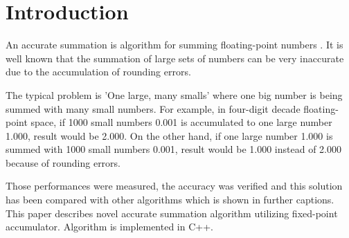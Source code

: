 \documentclass[conference]{IEEEtran}
\begin{document}
\section{Introduction}
An accurate summation \cite{Higham} is algorithm for summing 
floating-point numbers \cite{WhatShouldKnowAboutFP}. 
It is well known that the summation 
of large sets of numbers can be very inaccurate due
to the accumulation of rounding errors. 
\par
The typical problem is 'One large, many smalls' \cite{ComparisonOfMethods} 
where one big number is being summed with many small numbers. 
For example, in four-digit decade floating-point space,
if 1000 small numbers 0.001 is accumulated to one large 
number 1.000, result would be 2.000. On the other hand,
if one large number 1.000 is summed with 1000 small numbers 0.001,
result would be 1.000 instead of 2.000 because of rounding errors.
\par
Those performances were measured, the accuracy was verified and this 
solution has been compared with other algorithms which is 
shown in further captions. This paper describes novel accurate 
summation algorithm utilizing fixed-point accumulator.
Algorithm is implemented in C++.
\end{document}
